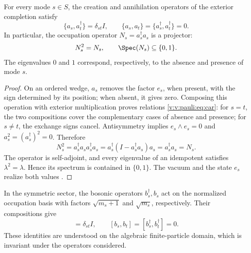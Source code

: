 \begin{theorem}
\label{v:v:rec:completaciones:statement:01}
\label{v:v:rec:thm:principio-exclusion-pauli}
For every mode \(s\in S\), the creation and annihilation operators of the
exterior completion satisfy
\begin{equation}
 \{a_s,a_t^\dagger\}=\delta_{st}I,
 \qquad
 \{a_s,a_t\}=\{a_s^\dagger,a_t^\dagger\}=0.
 \label{v:v:pauli:eq:car}
\end{equation}
In particular, the occupation operator
\(N_s=a_s^\dagger a_s\) is a projector:
\begin{equation}
 N_s^2=N_s,
 \qquad \Spec(N_s)\subseteq\{0,1\}.
 \label{v:v:pauli:eq:proyeccion-ocupacion}
\end{equation}
The eigenvalues \(0\) and \(1\) correspond, respectively, to the absence
and presence of mode \(s\).
\end{theorem}

\begin{proof}
On an ordered wedge, \(a_s\) removes the factor \(e_s\), when present,
with the sign determined by its position; when absent, it gives zero. Composing
this operation with exterior multiplication proves relations
\eqref{v:v:pauli:eq:car}: for \(s=t\), the two compositions cover the
complementary cases of absence and presence; for \(s\ne t\), the exchange
signs cancel. Antisymmetry implies
\(e_s\wedge e_s=0\) and
\(a_s^2=(a_s^\dagger)^2=0\). Therefore
\begin{equation}
 N_s^2=a_s^\dagger a_s a_s^\dagger a_s
 =a_s^\dagger(I-a_s^\dagger a_s)a_s
 =a_s^\dagger a_s=N_s.
 \label{v:v:pauli:eq:prueba-idempotencia}
\end{equation}
The operator is self-adjoint, and every eigenvalue of an idempotent satisfies
\(\lambda^2=\lambda\). Hence its spectrum is contained in
\(\{0,1\}\). The vacuum and the state \(e_s\) realize both values
\cite{v:Pauli1925,v:Dirac1926}.
\end{proof}

In the symmetric sector, the bosonic operators \(b_s^\dagger,b_s\)
act on the normalized occupation basis with factors
\(\sqrt{m_s+1}\) and \(\sqrt{m_s}\), respectively. Their compositions
give
\begin{equation}
 [b_s,b_t^\dagger]=\delta_{st}I,
 \qquad [b_s,b_t]=[b_s^\dagger,b_t^\dagger]=0.
 \label{v:v:pauli:eq:ccr}
\end{equation}
These identities are understood on the algebraic finite-particle domain,
which is invariant under the operators considered.

